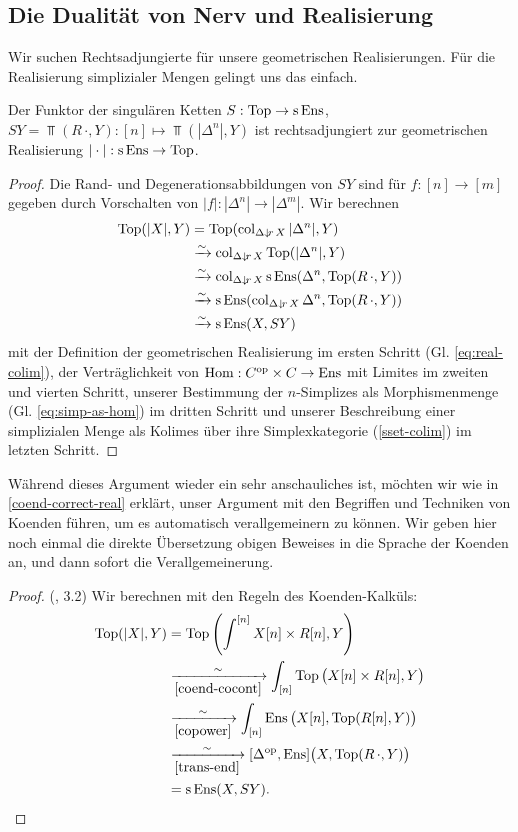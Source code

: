 \subsection{Die Dualität von Nerv und Realisierung}

Wir suchen Rechtsadjungierte für unsere geometrischen
Realisierungen. Für die Realisierung simplizialer Mengen gelingt uns
das einfach.
\begin{satz}
  Der Funktor der singulären Ketten $S: \operatorname{Top} \to \operatorname{s}\operatorname{Ens}$, $SY
  = \Top(R \, \cdot, Y): [n] \mapsto \Top(|\Delta^n|, Y)$ ist
  rechtsadjungiert zur geometrischen Realisierung
  $|\cdot|: \operatorname{s}\operatorname{Ens} \to \operatorname{Top}$.
\end{satz}
\begin{proof}
  Die Rand- und Degenerationsabbildungen von $SY$ sind für $f: [n] \to
  [m]$ gegeben durch Vorschalten von $|f|: |\Delta^n| \to
  |\Delta^m|$. Wir berechnen
  \begin{align*}
    \operatorname{Top}(|X|, Y)
    & = \operatorname{Top}(\operatorname{col}_{\Delta \downarrow \! {\scriptstyle r} \, X} |\Delta^n|, Y) \\
    & \xrightarrow[]{\sim} \operatorname{col}_{\Delta \downarrow \! {\scriptstyle r} \, X} \operatorname{Top}(|\Delta^n|, Y) \\
    & \xrightarrow[]{\sim} \operatorname{col}_{\Delta \downarrow \! {\scriptstyle r} \, X} \operatorname{s}\operatorname{Ens}(\Delta^n, \operatorname{Top}(R \, \cdot, Y)) \\
    & \xrightarrow[]{\sim} \operatorname{s}\operatorname{Ens}(\operatorname{col}_{\Delta \downarrow \! {\scriptstyle r} \, X} \Delta^n, \operatorname{Top}(R \, \cdot, Y)) \\
    & \xrightarrow[]{\sim} \operatorname{s}\operatorname{Ens}(X, SY)
  \end{align*}  
  mit der Definition der geometrischen Realisierung im ersten Schritt
  (Gl. \ref{eq:real-colim}), der Verträglichkeit von $\operatorname{Hom}:
  C^\mathrm{op} \times C \to \operatorname{Ens}$ mit Limites im zweiten und vierten Schritt,
  unserer Bestimmung der $n$-Simplizes als Morphismenmenge
  (Gl. \ref{eq:simp-as-hom}) im dritten Schritt und unserer
  Beschreibung einer simplizialen Menge als Kolimes über ihre
  Simplexkategorie (\ref{sset-colim}) im letzten Schritt.
\end{proof}
Während dieses Argument wieder ein sehr anschauliches ist, möchten wir
wie in \ref{coend-correct-real} erklärt, unser Argument mit den
Begriffen und Techniken von Koenden führen, um es automatisch
verallgemeinern zu können. Wir geben hier noch einmal die direkte
Übersetzung obigen Beweises in die Sprache der Koenden an, und dann
sofort die Verallgemeinerung.
\begin{proof} (\cite{Lore}, 3.2)
  Wir berechnen mit den Regeln des Koenden-Kalküls:
  \begin{align*}
     \operatorname{Top}(|X|, Y)
     &= \operatorname{Top} \left( \int^{[n]} X[n] \times R[n], Y \right) \\
     & \xrightarrow[\ref{coend-cocont}]{\sim}
       \int_{[n]} \operatorname{Top} \big( X[n] \times R[n], Y \big) \\
     & \xrightarrow[\ref{copower}]{\sim}
       \int_{[n]} \operatorname{Ens} \big( X[n], \operatorname{Top}(R[n], Y) \big) \\
     & \xrightarrow[\ref{trans-end}]{\sim}
       [\Delta^\mathrm{op}, \operatorname{Ens}] \big( X, \operatorname{Top}(R \, \cdot, Y) \big) \\
     &= \operatorname{s}\operatorname{Ens}(X, SY).
  \end{align*}
\end{proof}

